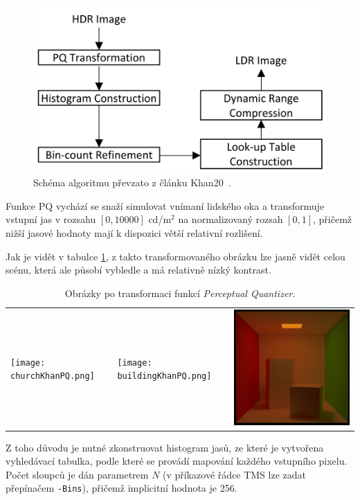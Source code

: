 \documentclass[11pt,a4paper,oneside]{article}
\begin{document}
\begin{figure}[htb]
  \begin{center}
    \includegraphics[width=0.8\linewidth]{fig/schema.png}
      \caption{Schéma algoritmu převzato z článku Khan20~\cite{Khan2020}.} 
    \label{fig:schema}
  \end{center}
\end{figure}

Funkce PQ vychází se snaží simulovat vnímaní lidského oka a transformuje
vstupní jas v rozsahu $[0, 10000]$ cd/m$^2$ na normalizovaný rozsah $[0,1]$,
přičemž nižší jasové hodnoty mají k dispozici větší relativní rozlišení.

Jak je vidět v tabulce \ref{tab:method-pq}, z takto transformovaného obrázku lze
jasně vidět celou scénu, která ale působí vybledle a má relativně nízký kontrast.

\begin{table}[htb]
    \centering
    \caption{Obrázky po transformaci funkcí \textit{Perceptual Quantizer}.}
    \label{tab:method-pq}
    \begin{tabular}{lll}
        \texttt{[image: churchKhanPQ.png]} &
        \texttt{[image: buildingKhanPQ.png]} &
        \includegraphics[width=.33\linewidth,valign=m]{cornell_boxKhanPQ.png} \\
    \end{tabular}
\end{table}

Z toho důvodu je nutné zkonstruovat histogram jasů, ze které je vytvořena
vyhledávací tabulka, podle které se provádí mapování každého vstupního pixelu.
Počet sloupců je dán parametrem $N$ (v příkazové řádce TMS lze zadat přepínačem
\texttt{-Bins}), přičemž implicitní hodnota je 256.
\end{document}
